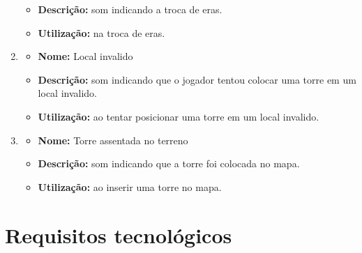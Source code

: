 \documentclass[11pt]{article} %
\begin{document}
\begin{enumerate}
\begin{itemize}
\item \textbf{Descrição:} som indicando a troca de eras.
\item \textbf{Utilização:} na troca de eras.
\end{itemize}
\item \begin{itemize}
\item \textbf{Nome:} Local invalido
\item \textbf{Descrição:} som indicando que o jogador tentou colocar uma torre em um local invalido.
\item \textbf{Utilização:} ao tentar posicionar uma torre em um local invalido.
\end{itemize}
\item \begin{itemize}
\item \textbf{Nome:} Torre assentada no terreno
\item \textbf{Descrição:} som indicando que a torre foi colocada no mapa.
\item \textbf{Utilização:} ao inserir uma torre no mapa.
\end{itemize}
\end{enumerate}





\section{Requisitos tecnológicos}
\end{document}
